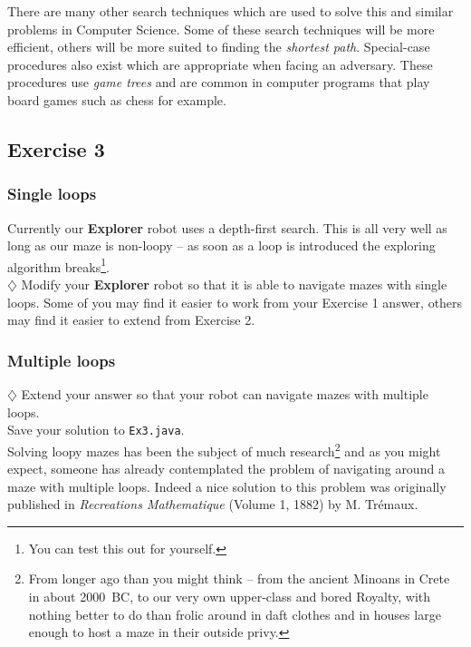\noindent
There are many other search techniques which are used to solve this and
similar problems in Computer Science. Some of these search techniques will
be more efficient, others will be more suited to finding the {\it shortest
path}. Special-case procedures also exist which are appropriate when
facing an adversary. These procedures use {\it game trees} and are common
in computer programs that play board games such as chess for example.

\subsection{Exercise 3}

\subsubsection{Single loops}

Currently our {\bf Explorer} robot uses a depth-first search. This is all very 
well as long as our maze is non-loopy -- as soon as a loop is introduced the
exploring algorithm breaks\footnote{You can test this out for yourself.}.\\
 
\noindent
$\diamondsuit$ Modify your {\bf Explorer} robot so that it is able to navigate mazes with 
single loops. Some of you may find it easier to work from your Exercise 1 answer,
others may find it easier to extend from Exercise 2. \\

\subsubsection{Multiple loops}

$\diamondsuit$
Extend your answer so that your robot can navigate
mazes with multiple loops. \\

\noindent
Save your solution to {\tt Ex3.java}. \\

\noindent
Solving loopy mazes has been the subject of much research\footnote{From
longer ago than you might think -- from the ancient Minoans in Crete in
about 2000~BC, to our very own upper-class and bored Royalty, with nothing better
to do than frolic around in daft clothes and in houses large enough
to host a maze in their outside privy.}
and as you might expect, someone has already contemplated the problem of
navigating around a maze with multiple loops. Indeed a nice solution to
this problem was originally published in {\em Recreations Mathematique}
(Volume 1, 1882) by M. Tr\'{e}maux. 

